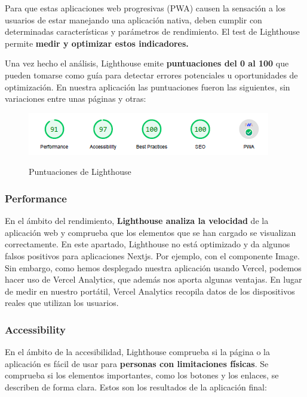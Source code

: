 \documentclass[12pt,twoside,titlepage]{report}
\begin{document}
Para que estas aplicaciones web progresivas (PWA) causen la sensación a los usuarios de estar manejando una aplicación nativa, deben cumplir con determinadas características y parámetros de rendimiento. El test de Lighthouse permite \textbf{medir y optimizar estos indicadores.}

Una vez hecho el análisis, Lighthouse emite \textbf{puntuaciones del 0 al 100} que pueden tomarse como guía para detectar errores potenciales u oportunidades de optimización. En nuestra aplicación las puntuaciones fueron las siguientes, sin variaciones entre unas páginas y otras:

\begin{figure}[H]
    \centering
    \includegraphics[scale=1.2]{Lighthouse/Resumen}
    \label{fig:Lighthouse_resumen}
    \caption{Puntuaciones de Lighthouse}
\end{figure}

\subsubsection{Performance}

En el ámbito del rendimiento, \textbf{Lighthouse analiza la velocidad} de la aplicación web y comprueba que los elementos que se han cargado se visualizan correctamente. En este apartado, Lighthouse no está optimizado y da algunos falsos positivos para aplicaciones Nextjs. Por ejemplo, con el componente Image. Sin embargo, como hemos desplegado nuestra aplicación usando Vercel, podemos hacer uso de Vercel Analytics, que además nos aporta algunas ventajas. En lugar de medir en nuestro portátil, Vercel Analytics recopila datos de los dispositivos reales que utilizan los usuarios. 

\subsubsection{Accessibility}

En el ámbito de la accesibilidad, Lighthouse comprueba si la página o la aplicación es fácil de usar para \textbf{personas con limitaciones físicas}. Se comprueba si los elementos importantes, como los botones y los enlaces, se describen de forma clara. Estos son los resultados de la aplicación final:
\end{document}
